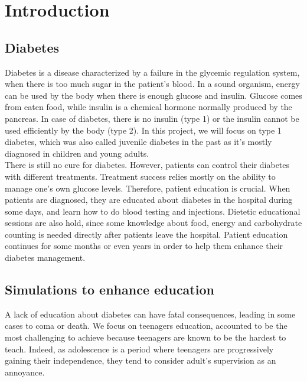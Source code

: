 \documentclass[12pt,MSc]{muthesis}
\begin{document}
\tableofcontents

\chapter{Introduction}
\section{Diabetes}
Diabetes is a disease characterized by a failure in the glycemic regulation system, when there is too much
sugar in the patient's blood. In a sound organism, energy can be used by the body when there is enough glucose and insulin. Glucose comes from eaten food, while insulin is a chemical hormone normally produced by the pancreas. In case of diabetes, there is no insulin (type 1) or the insulin cannot be used efficiently by the body (type 2). In this project, we will focus on type 1 diabetes, which was also called juvenile diabetes in the past as it's mostly diagnosed in children and young adults.\\There is still no cure for diabetes. However, patients can control their diabetes with different treatments. Treatment success relies mostly on the ability to manage one's own glucose levels. Therefore, patient education is crucial. 
When patients are diagnosed, they are educated about diabetes in the hospital during some days, and learn how to do blood testing and injections. Dietetic educational sessions are also hold, since some knowledge about food, energy and carbohydrate counting is needed directly after patients leave the hospital. Patient education continues for some months or even years in order to help them enhance their diabetes management.

\section{Simulations to enhance education}
A lack of education about diabetes can have fatal consequences, leading in some cases to coma
or death. We focus on teenagers education, accounted to be the most challenging to achieve because teenagers are known to be the hardest to teach. Indeed, as adolescence is a period where teenagers are progressively gaining their independence, they tend to consider adult's supervision as an annoyance.
\end{document}
